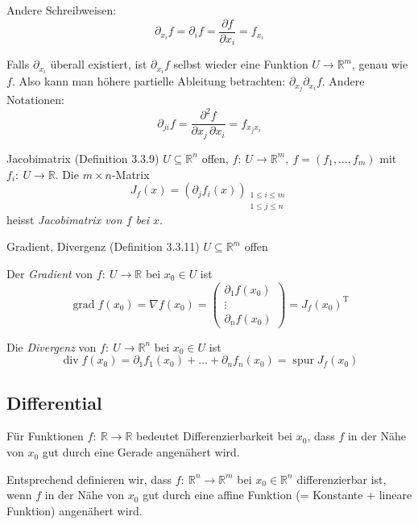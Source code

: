 \documentclass[a4paper,10pt]{article}
\def\R{\mathbb{R}}
\DeclareMathOperator{\gradient}{grad}
\DeclareMathOperator{\divergence}{div}
\DeclareMathOperator{\trace}{spur}
\begin{document}
Andere Schreibweisen:
\[ \partial_{x_i} f = \partial_i f = \frac{\partial f}{\partial x_i} = f_{x_i} \]

Falls \( \partial_{x_i} \) überall existiert, ist \( \partial_{x_i} f \) selbst wieder eine Funktion \( U \to \R^m \), genau wie \( f \). Also kann man höhere partielle Ableitung betrachten: \( \partial_{x_j} \partial_{x_i} f \). Andere Notationen:
\[ \partial_{ji} f = \frac{\partial^2 f}{\partial x_j \, \partial x_i} = f_{x_j x_i} \]

\begin{mainbox}{Jacobimatrix (Definition 3.3.9)}
    \( U \subseteq \R^n \) offen, \( f: \: U \to \R^m, \ f = (f_1, \dots, f_m) \) mit \( f_i: \: U \to \R \).
    Die \( m \! \times \! n \)-Matrix
    \[ J_f(x) = \left( \partial_j f_i(x) \right)_\substack{1 \leq i \leq m \\ 1 \leq j \leq n} \]
    heisst \emph{Jacobimatrix von \( f \) bei \( x \)}.
\end{mainbox}

\begin{mainbox}{Gradient, Divergenz (Definition 3.3.11)}
    \( U \subseteq \R^m \) offen
    
    Der \emph{Gradient} von \( f: \: U \to \R \) bei \( x_0 \in U \) ist
    \[ \gradient f(x_0) = \nabla f(x_0) = \begin{pmatrix*}
        \partial_1 f(x_0) \\
        \vdots \\
        \partial_n f(x_0)
    \end{pmatrix*} = J_f(x_0)^\mathrm{T} \]

    Die \emph{Divergenz} von \(f: \: U \to \R^n \) bei \( x_0 \in U \) ist
    \[ \divergence f(x_0) = \partial_1 f_1(x_0) + \dots + \partial_n f_n(x_0) = \trace J_f(x_0) \]
\end{mainbox}


\subsection{Differential}

Für Funktionen \( f: \: \R \to \R \) bedeutet Differenzierbarkeit bei \( x_0 \), dass \( f \) in der Nähe von \( x_0 \) gut durch eine Gerade angenähert wird.

Entsprechend definieren wir, dass \( f: \: \R^n \to \R^m \) bei \( x_0 \in \R^n \) differenzierbar ist, wenn \( f \) in der Nähe von \( x_0 \) gut durch eine affine Funktion (= Konstante + lineare Funktion) angenähert wird.
\end{document}
